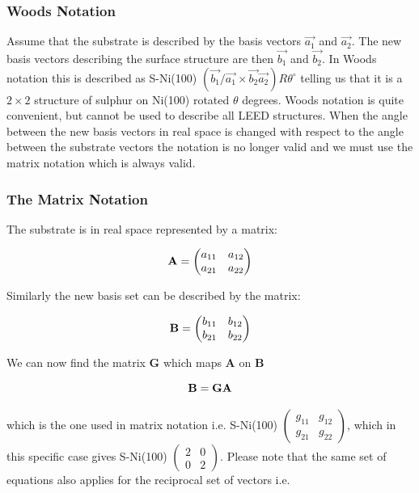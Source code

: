 \subsubsection{Woods Notation}
Assume that the substrate is described by the basis vectors $\vec{a_1}$ and $\vec{a_2}$. The new basis vectors describing the surface structure are then $\vec{b_1}$ and  $\vec{b_2}$. In Woods notation this is described as S-Ni(100) $(\vec{b_1}/\vec{a_1}\times\vec{b_2}\vec{a_2})R\theta^{\circ}$ telling us that it is a $2\times 2$ structure of sulphur on  Ni(100) rotated $\theta$ degrees. Woods notation is quite convenient, but cannot be used to describe all LEED structures. When the angle between the new basis vectors in real space is changed with respect to the angle between the  substrate vectors the notation is no longer valid and we must use the matrix notation which is always valid.

\subsubsection{The Matrix Notation}
The substrate is in real space represented by a matrix:

\begin{equation}
{\bf A}=\begin{pmatrix}
a_{11}	& a_{12}	\\
a_{21}	& a_{22}
\end{pmatrix}
\end{equation}

Similarly the new basis set can be described by the matrix:

\begin{equation}
{\bf B}=\begin{pmatrix}
b_{11}	& b_{12}	\\
b_{21}	& b_{22}
\end{pmatrix}
\end{equation}

We can now find the matrix {\bf G} which maps {\bf A} on {\bf B}

\begin{equation}
{\bf B}={\bf GA}
\end{equation}

\noindent which is the one used in matrix notation i.e. S-Ni(100) $\left(\begin{smallmatrix} g_{11}	& g_{12}	\\ g_{21}	& g_{22 }\end{smallmatrix}\right)$, which in this specific case gives S-Ni(100) $\left(\begin{smallmatrix} 2	& 0	\\ 0	& 2 \end{smallmatrix}\right)$. Please note that the same set of equations also applies for the reciprocal set of vectors i.e.

